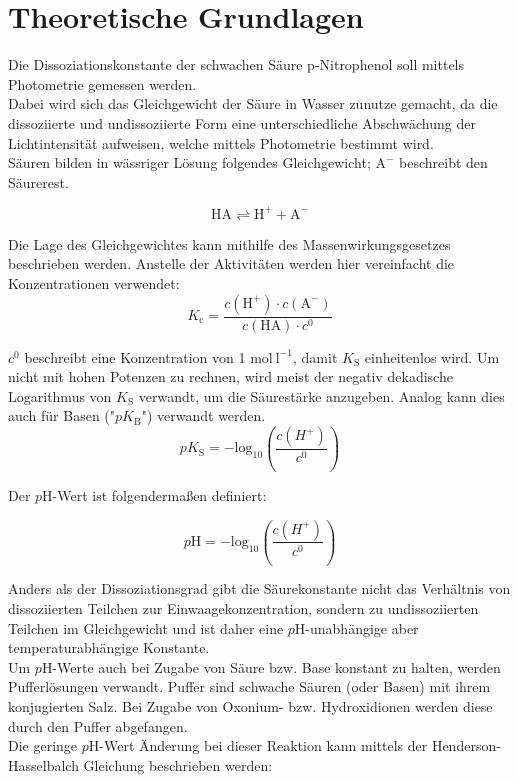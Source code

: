 \documentclass[12pt,a4paper,titlepage,headinclude,bibtotoc]{scrartcl}
\begin{document}
\tableofcontents

\newpage

\section{Theoretische Grundlagen}

Die Dissoziationskonstante der schwachen Säure p-Nitrophenol soll mittels Photometrie gemessen werden. \\
Dabei wird sich das Gleichgewicht der Säure in Wasser zunutze gemacht, da die dissoziierte und undissoziierte Form eine unterschiedliche Abschwächung der Lichtintensität aufweisen, welche mittels Photometrie bestimmt wird.\\

Säuren bilden in wässriger Lösung folgendes Gleichgewicht; $\mathrm{A^-}$ beschreibt den Säurerest.

\begin{equation}
\mathrm{HA}  \rightleftharpoons \mathrm{H^+} + \mathrm{A^-}
\end{equation}

Die Lage des Gleichgewichtes kann mithilfe des Massenwirkungsgesetzes beschrieben werden. Anstelle der Aktivitäten werden hier vereinfacht die Konzentrationen verwendet:\\

\begin{equation}
K_\mathrm{c} =\frac{c(\mathrm{H^+}) \cdot c\mathrm{(A^-)}}{c\mathrm{(HA)} \cdot c^0}
\end{equation}

$c^0$ beschreibt eine Konzentration von 1 $\mathrm{mol{~}l^{-1}}$, damit $K_\mathrm{S}$ einheitenlos wird. Um nicht mit hohen Potenzen zu rechnen, wird meist der negativ dekadische Logarithmus von $K_\mathrm{S}$ verwandt, um die Säurestärke anzugeben. Analog kann dies auch für Basen ("$pK_\mathrm{B}$") verwandt werden.\\

\begin{equation}
pK_\mathrm{S} = \mathrm{-log_{10}} \left(\frac{c(H^+)}{c^0}\right)
\end{equation}

Der $p$H-Wert ist folgendermaßen definiert:

\begin{equation}
p\mathrm{H}= \mathrm{-log}_{10}\left(\frac{c(H^+)}{c^0}\right)
\end{equation}

Anders als der Dissoziationsgrad gibt die Säurekonstante nicht das Verhältnis von dissoziierten Teilchen zur Einwaagekonzentration, sondern zu undissoziierten Teilchen im Gleichgewicht und ist daher eine $p$H-unabhängige aber temperaturabhängige Konstante.\\
Um $p$H-Werte auch bei Zugabe von Säure bzw. Base konstant zu halten, werden Pufferlösungen verwandt. Puffer sind schwache Säuren (oder Basen) mit ihrem konjugierten Salz. Bei Zugabe von Oxonium- bzw. Hydroxidionen werden diese durch den Puffer abgefangen.\\
Die geringe $p$H-Wert Änderung bei dieser Reaktion kann mittels der Henderson-Hasselbalch Gleichung beschrieben werden:\\
\end{document}
